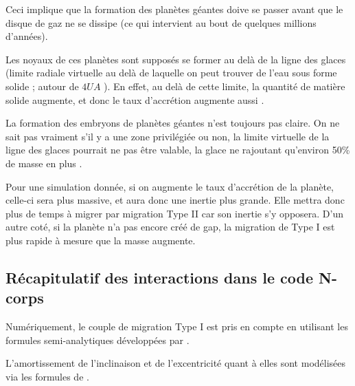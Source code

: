 Ceci implique que la formation des planètes géantes doive se passer avant que le disque de gaz ne se dissipe (ce qui intervient au bout de quelques millions d'années).

Les noyaux de ces planètes sont supposés se former au delà de la ligne des glaces (limite radiale virtuelle au delà de laquelle on peut trouver de l'eau sous forme solide ; autour de $4\unit{UA}$ \citep{martin2013evolution}). En effet, au delà de cette limite, la quantité de matière solide augmente, et donc le taux d'accrétion augmente aussi \citep{sasselov2000snowline}.

La formation des embryons de planètes géantes n'est toujours pas claire. On ne sait pas vraiment s'il y a une zone privilégiée ou non, la limite virtuelle de la ligne des glaces pourrait ne pas être valable, la glace ne rajoutant qu'environ 50\% de masse en plus \citep{lodders2003solar}.


\bigskip

Pour une simulation donnée, si on augmente le taux d'accrétion de la planète, celle-ci sera plus massive, et aura donc une inertie plus grande. Elle mettra donc plus de temps à migrer par migration Type II car son inertie s'y opposera. D'un autre coté, si la planète n'a pas encore créé de gap, la migration de Type I est plus rapide à mesure que la masse augmente. 

\subsection{Récapitulatif des interactions dans le code N-corps}
Numériquement, le couple de migration Type I est pris en compte en utilisant les formules semi-analytiques développées par \cite{paardekooper2011torque}. 

L'amortissement de l'inclinaison et de l'excentricité quant à elles sont modélisées via les formules de \cite{cresswell2008three}.

